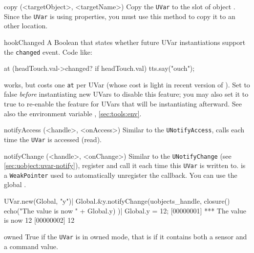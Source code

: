 \begin{urbiscriptapi}

\item[copy](<targetObject>, <targetName>)
  Copy the \lstinline|UVar| to the slot  of object
  . Since the \lstinline|UVar| is using properties, you must
  use this method to copy it to an other location.

\item[hookChanged]%
  A Boolean that states whether future UVar instantiations support the
  \lstinline|changed| event.  Code like:

\begin{urbiunchecked}
at (headTouch.val->changed? if headTouch.val)
  tts.say("ouch");
\end{urbiunchecked}
  \noindent
  works, but costs one \lstinline|at| per UVar (whose cost is light in
  recent version of \usdk).  Set  to false
  \emph{before} instantiating new UVars to disable this feature; you may
  also set it to true to re-enable the feature for UVars that will be
  instantiating afterward.  See also the environment variable
  , \autoref{sec:tools:env}.

\item[notifyAccess](<handle>, <onAccess>)%
  Similar to the \Cxx \lstinline|UNotifyAccess|, calls  each
  time the \lstinline|UVar| is accessed (read).

\item[notifyChange](<handle>, <onChange>)
  Similar to the \Cxx \lstinline|UNotifyChange|
  (see \autoref{sec:uobject:uvar-notify}), register  and
  call it each time this \lstinline|UVar| is written to.
   is a \lstinline|WeakPointer| used to automatically unregister
  the callback. You can use the global .
\begin{urbiscript}
UVar.new(Global, "y")|
Global.&y.notifyChange(uobjects_handle, closure() {
  echo("The value is now " + Global.y)
})|
Global.y = 12;
[00000001] *** The value is now 12
[00000002] 12
\end{urbiscript}

\item[owned]
  True if the \lstinline|UVar| is in owned mode, that is if it contains both a
  sensor and a command value.

\end{urbiscriptapi}

